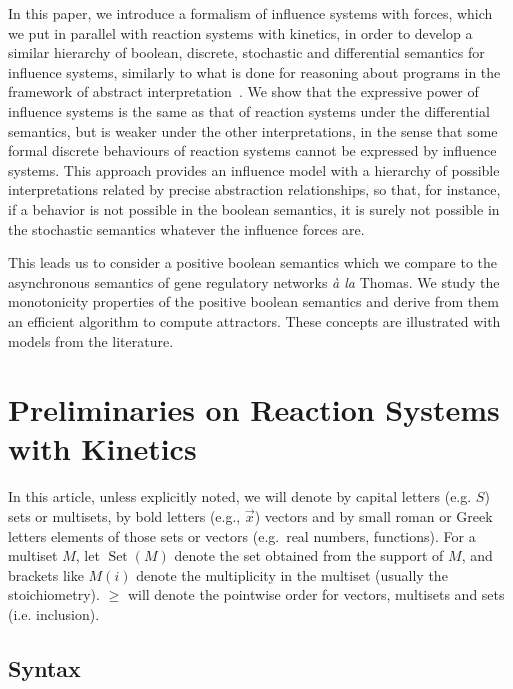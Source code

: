 \documentclass{llncs}
\DeclareMathOperator{\Set}{Set}
\begin{document}
  In this paper, we introduce a formalism of influence systems with forces, which we put in parallel with reaction systems with kinetics,
  in order to develop a similar hierarchy of boolean, discrete, stochastic and differential semantics for influence systems,
  similarly to what is done for reasoning about programs in the framework of abstract interpretation~\cite{CC77popl,FS08tcs}.
  We show that the expressive power of influence systems is the same as that of reaction systems under the differential semantics,
  but is weaker under the other interpretations, in the sense that some formal discrete behaviours of reaction systems cannot be expressed
  by influence systems.
  This approach provides an influence model with a hierarchy of possible interpretations related by precise abstraction relationships,
  so that, for instance, if a behavior is not possible in the boolean semantics, it is surely not possible
  in the stochastic semantics whatever the influence forces are.
  
   This leads us to consider a positive boolean semantics which we compare
   to the asynchronous semantics of gene regulatory networks \emph{\`a la} Thomas.
   We study the monotonicity properties of the positive boolean semantics
   and derive from them an efficient algorithm to compute attractors.
These concepts are illustrated with models from the literature.
  
\section{Preliminaries on Reaction Systems with Kinetics}


In this article, unless explicitly noted, we will denote by capital letters
(e.g. $S$) sets or multisets, by bold letters (e.g., $\vec x$) vectors and by
small roman or Greek letters elements of those sets or vectors (e.g.~real
numbers, functions).
For a multiset $M$, let $\Set(M)$ denote the set obtained from the support of
$M$, and brackets like $M(i)$ denote the multiplicity in the multiset (usually
the stoichiometry).
$\geq$ will denote the pointwise order for vectors, multisets and sets (i.e.
inclusion).

\subsection{Syntax}
\end{document}
